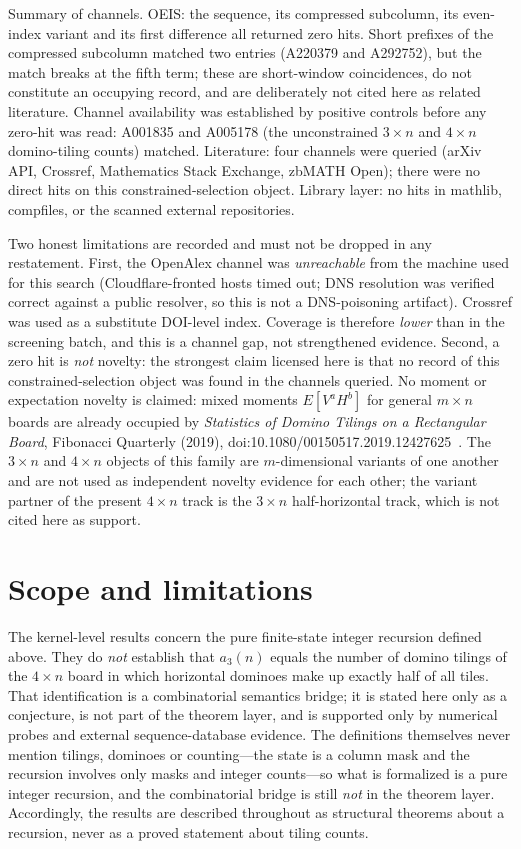 \documentclass[11pt]{article}
\begin{document}
Summary of channels. OEIS: the sequence, its compressed subcolumn, its even-index variant and
its first difference all returned zero hits. Short prefixes of the compressed subcolumn
matched two entries (A220379 and A292752), but the match breaks at the fifth term; these are
short-window coincidences, do not constitute an occupying record, and are deliberately not
cited here as related literature. Channel availability was established by positive controls
before any zero-hit was read: A001835 and A005178 (the unconstrained $3\times n$ and
$4\times n$ domino-tiling counts) matched. Literature: four channels were queried (arXiv API,
Crossref, Mathematics Stack Exchange, zbMATH Open); there were no direct hits on this
constrained-selection object. Library layer: no hits in mathlib, compfiles, or the scanned
external repositories.

Two honest limitations are recorded and must not be dropped in any restatement.
First, the OpenAlex channel was \emph{unreachable} from the machine used for this search
(Cloudflare-fronted hosts timed out; DNS resolution was verified correct against a public
resolver, so this is not a DNS-poisoning artifact). Crossref was used as a substitute
DOI-level index. Coverage is therefore \emph{lower} than in the screening batch, and this is
a channel gap, not strengthened evidence.
Second, a zero hit is \emph{not} novelty: the strongest claim licensed here is that no record
of this constrained-selection object was found in the channels queried.
No moment or expectation novelty is claimed: mixed moments $E[V^a H^b]$ for general $m\times n$
boards are already occupied by \emph{Statistics of Domino Tilings on a Rectangular Board},
Fibonacci Quarterly (2019), doi:10.1080/00150517.2019.12427625~\cite{fq2019}.
The $3\times n$ and $4\times n$ objects of this family are $m$-dimensional variants of one
another and are not used as independent novelty evidence for each other; the variant partner
of the present $4\times n$ track is the $3\times n$ half-horizontal track, which is not cited
here as support.

\section{Scope and limitations}
The kernel-level results concern the pure finite-state integer recursion defined above. They
do \emph{not} establish that $a_3(n)$ equals the number of domino tilings of the $4\times n$
board in which horizontal dominoes make up exactly half of all tiles. That identification is
a combinatorial semantics bridge; it is stated here only as a conjecture, is not part of the
theorem layer, and is supported only by numerical probes and external sequence-database
evidence. The definitions themselves never mention tilings, dominoes or counting---the state
is a column mask and the recursion involves only masks and integer counts---so what is
formalized is a pure integer recursion, and the combinatorial bridge is still \emph{not} in
the theorem layer. Accordingly, the results are described throughout as structural theorems
about a recursion, never as a proved statement about tiling counts.
\end{document}
